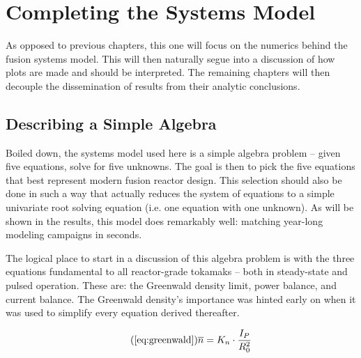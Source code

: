 %
%
%
%
%
%
%
%

\chapter{Completing the Systems Model}

\label{chapter:complete}

As opposed to previous chapters, this one will focus on the numerics behind the fusion systems model. This will then naturally segue into a discussion of how plots are made and should be interpreted. The remaining chapters will then decouple the dissemination of results from their analytic conclusions.

\section{Describing a Simple Algebra}

Boiled down, the systems model used here is a simple algebra problem -- given five equations, solve for five unknowns. The goal is then to pick the five equations that best represent modern fusion reactor design. This selection should also be done in such a way that actually reduces the system of equations to a simple univariate root solving equation (i.e. one equation with one unknown). As will be shown in the results, this model does remarkably well: matching year-long modeling campaigns in seconds.

The logical place to start in a discussion of this algebra problem is with the three equations fundamental to all reactor-grade tokamaks -- both in steady-state and pulsed operation. These are: the Greenwald density limit, power balance, and current balance. The Greenwald density's importance was hinted early on when it was used to simplify every equation derived thereafter. 

\begin{equation}
	\tag{\ref{eq:greenwald}}
	\overline n = K_n \cdot \frac{I_P}{R_0^2}
\end{equation}

